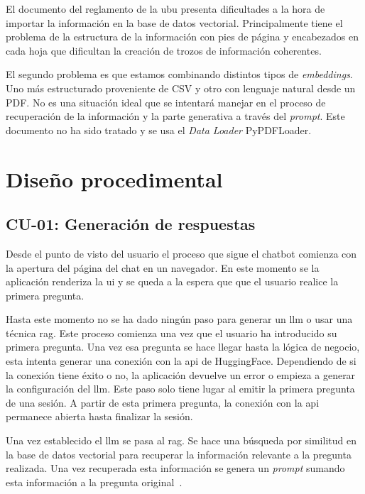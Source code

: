 El documento del reglamento de la \acrshort{ubu} presenta dificultades a la hora de importar la información en la base de datos vectorial. Principalmente tiene el problema de la estructura de la información con pies de página y encabezados en cada hoja que dificultan la creación de trozos de información coherentes. 

El segundo problema es que estamos combinando distintos tipos de \textit{embeddings}. Uno más estructurado proveniente de CSV y otro con lenguaje natural desde un PDF. No es una situación ideal que se intentará manejar en el proceso de recuperación de la información y la parte generativa a través del \textit{prompt}. Este documento no ha sido tratado y se usa el \textit{Data Loader} PyPDFLoader.

\section{Diseño procedimental}

\subsection{CU-01: Generación de respuestas}

Desde el punto de visto del usuario el proceso que sigue el chatbot comienza con la apertura del página del chat en un navegador. En este momento se la aplicación renderiza la \acrshort{ui} y se queda a la espera que que el usuario realice la primera pregunta.

Hasta este momento no se ha dado ningún paso para generar un \acrshort{llm} o usar una técnica \acrshort{rag}. Este proceso comienza una vez que el usuario ha introducido su primera pregunta. Una vez esa pregunta se hace llegar hasta la lógica de negocio, esta intenta generar una conexión con la \acrshort{api} de HuggingFace. Dependiendo de si la conexión tiene éxito o no, la aplicación devuelve un error o empieza a generar la configuración del \acrshort{llm}. Este paso solo tiene lugar al emitir la primera pregunta de una sesión. A partir de esta primera pregunta, la conexión con la \acrshort{api} permanece abierta hasta finalizar la sesión.

Una vez establecido el \acrshort{llm} se pasa al \acrshort{rag}. Se hace una búsqueda por similitud en la base de datos vectorial para recuperar la información relevante a la pregunta realizada. Una vez recuperada esta información se genera un \textit{prompt} sumando esta información a la pregunta original~\cite{Lewis2020}.

